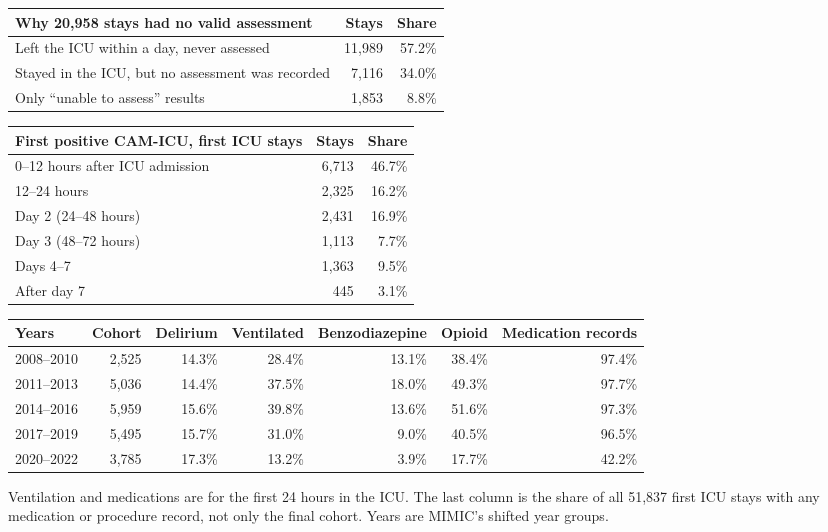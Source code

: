 \documentclass[11pt]{article}
\begin{document}
\begin{center}
\begin{tabular}{l r r}
	\toprule
	Why 20,958 stays had no valid assessment & Stays & Share \\
	\midrule
	Left the ICU within a day, never assessed & 11,989 & 57.2\% \\
	Stayed in the ICU, but no assessment was recorded & 7,116 & 34.0\% \\
	Only ``unable to assess'' results & 1,853 & 8.8\% \\
	\bottomrule
\end{tabular}
\end{center}

\begin{center}
\begin{tabular}{l r r}
	\toprule
	First positive CAM-ICU, first ICU stays & Stays & Share \\
	\midrule
	0--12 hours after ICU admission & 6,713 & 46.7\% \\
	12--24 hours & 2,325 & 16.2\% \\
	Day 2 (24--48 hours) & 2,431 & 16.9\% \\
	Day 3 (48--72 hours) & 1,113 & 7.7\% \\
	Days 4--7 & 1,363 & 9.5\% \\
	After day 7 & 445 & 3.1\% \\
	\bottomrule
\end{tabular}
\end{center}

\begin{center}
\small
\setlength{\tabcolsep}{4pt}
\begin{tabular}{l r r r r r r}
	\toprule
	Years & Cohort & Delirium & Ventilated & Benzodiazepine & Opioid & Medication records \\
	\midrule
	2008--2010 & 2,525 & 14.3\% & 28.4\% & 13.1\% & 38.4\% & 97.4\% \\
	2011--2013 & 5,036 & 14.4\% & 37.5\% & 18.0\% & 49.3\% & 97.7\% \\
	2014--2016 & 5,959 & 15.6\% & 39.8\% & 13.6\% & 51.6\% & 97.3\% \\
	2017--2019 & 5,495 & 15.7\% & 31.0\% & 9.0\% & 40.5\% & 96.5\% \\
	2020--2022 & 3,785 & 17.3\% & 13.2\% & 3.9\% & 17.7\% & 42.2\% \\
	\bottomrule
\end{tabular}
\end{center}

{\small\color{black!60}Ventilation and medications are for the first 24 hours in the ICU. The last column is the share of all 51,837 first ICU stays with any medication or procedure record, not only the final cohort. Years are MIMIC's shifted year groups.\par}
\end{document}
